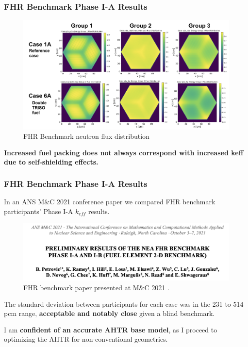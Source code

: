 \begin{frame}
    \frametitle{FHR Benchmark Phase I-A Results}
    \begin{figure}
        \centering
        \includegraphics[width=\linewidth]{figures/phase1a-flux.png} 
        \vspace{-0.5cm}
        \caption{FHR Benchmark neutron flux distribution}
    \end{figure}
    \vspace{-0.3cm}
    \textbf{Increased fuel packing does not always correspond with increased keff 
    due to self-shielding effects.}
\end{frame}

\begin{frame}
    \frametitle{FHR Benchmark Phase I-A Results}
    In an ANS M$\&$C 2021 conference paper we compared FHR benchmark participants' 
    Phase I-A $k_{eff}$ results. 
    \begin{figure}[]
        \centering
        \includegraphics[width=0.85\linewidth]{figures/mnc.png} 
        \caption{FHR benchmark paper presented at M$\&$C 2021 
        \cite{petrovic_preliminary_2021}.}
    \end{figure}

    The standard deviation between participants for each case was in the 231 to 514 
    pcm range, \textbf{acceptable and notably close} given a blind benchmark.

    I am \textbf{confident of an accurate AHTR base model}, as I proceed to
    optimizing the AHTR for non-conventional geometries. 
\end{frame}
